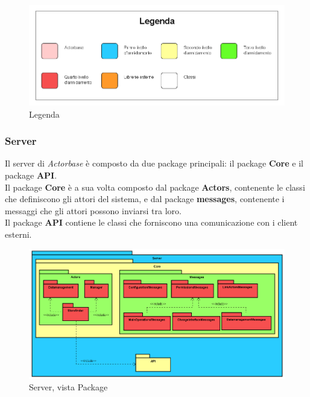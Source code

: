 \documentclass[a4paper]{article}
\begin{document}
		\begin{figure} [H]
			\centering
			\includegraphics[scale=0.3]{ST/Legenda.png}
			\caption{Legenda}
		\end{figure}
            \subsubsection{Server}
        	Il server di \emph{Actorbase} è composto da due package principali: il package \textbf{Core} e il package \textbf{API}. \\
            Il package \textbf{Core} è a sua volta composto dal package \textbf{Actors}, contenente le classi che definiscono gli attori del sistema, e dal package \textbf{messages}, contenente i messaggi che gli attori possono inviarsi tra loro. \\
            Il package \textbf{API} contiene le classi che forniscono una comunicazione con i client esterni.
            \begin{figure} [H]
			\centering
			\includegraphics[scale=0.35]{Server/Package/serverALL.png}
			\caption{Server, vista Package}
		\end{figure}
\end{document}
